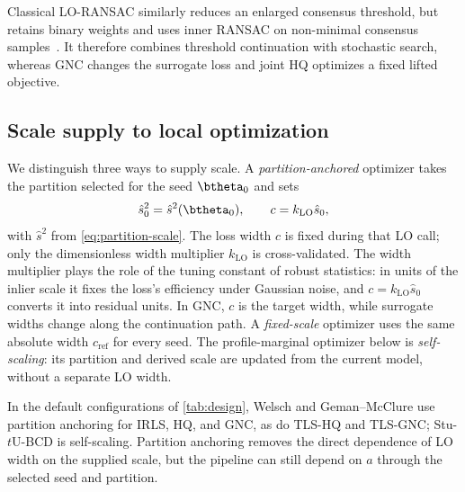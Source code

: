 \documentclass[runningheads]{llncs}
\newcommand{\suppsec}[1]{Supp.\ Sec.~\ref{supp:#1}}
\newcommand{\stuU}{Stu-$t$U}          %
\newcommand{\klo}{k_{\mathrm{LO}}}
\begin{document}
Classical LO-RANSAC similarly reduces an enlarged consensus threshold,
but retains binary weights and uses inner RANSAC on non-minimal
consensus samples~\cite{Chum2003,Lebeda2012}.
It therefore combines threshold continuation with stochastic search,
whereas GNC changes the surrogate loss and joint HQ optimizes a
fixed lifted objective.

\subsection{Scale supply to local optimization}
\label{sec:scale-interface}
We distinguish three ways to supply scale. A \emph{partition-anchored}
optimizer takes the partition selected for the seed $\btheta_0$ and sets
\begin{equation}
	\hat s_0^2=\hat s^2(\btheta_0),
	\qquad c=\klo\hat s_0,
	\label{eq:partition-anchor}
\end{equation}
with $\hat s^2$ from \cref{eq:partition-scale}.
The loss width $c$ is fixed during that LO call; only the dimensionless
width multiplier $\klo$ is cross-validated. The width multiplier plays the
role of the tuning constant of robust statistics: in units of the inlier
scale it fixes the loss's efficiency under Gaussian noise, and $c=\klo\hat s_0$
converts it into residual units. In GNC, $c$ is the target
width, while surrogate widths change along the continuation path.
A \emph{fixed-scale} optimizer uses the same absolute width
$c_{\mathrm{ref}}$ for every seed. The profile-marginal optimizer below
is \emph{self-scaling}: its partition and derived scale are updated
from the current model, without a separate LO width.

In the default configurations of \cref{tab:design}, Welsch and
Geman--McClure use partition anchoring for IRLS, HQ, and GNC, as do
TLS-HQ and TLS-GNC; \stuU{}-BCD is self-scaling.
Partition anchoring removes the direct dependence of LO width on the
supplied scale, but the pipeline can still depend on $a$ through the
selected seed and partition.




\begin{table}[t]
	\centering
	\caption{\textbf{Local objectives and optimization strategies.}
		Names follow \emph{objective--strategy}. Entries give
		single-threaded time per LO call in ms on PhotoTourism under
		the shared 25-model-update cap.
		$^{\dagger}$\stuU{}-BCD optimizes the profile-marginal score.
		Timing details are in \suppsec{sec:supp-budget}.}
	\label{tab:design}
	\setlength{\tabcolsep}{3.5pt}
	\small
	\begin{adjustbox}{max width=\linewidth}
		
	\end{adjustbox}
\end{table}
\end{document}
